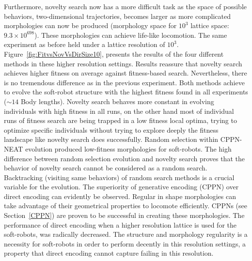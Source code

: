 Furthermore, novelty search now has a more difficult task as the space of possible behaviors, two-dimensional trajectories, becomes larger as more complicated morphologies can now be produced (morphology space for $10^3$ lattice space: $9.3 \times 10^{698}$). These morphologies can achieve life-like locomotion. The same experiment as before held under a lattice resolution of $10^3$. Figure~\ref{fig:FitvsNovVsDirSize10}, presents the results of the four different methods in these higher resolution settings. Results reassure that novelty search achieves higher fitness on average against fitness-based search. Nevertheless, there is no tremendous difference as in the previous experiment. Both methods achieve to evolve the soft-robot structure with the highest fitness found in all experiments ($\sim 14$ Body lengths). Novelty search behaves more constant in evolving individuals with high fitness in all runs, on the other hand most of individual runs of fitness search are being trapped in a low fitness local optima, trying to optimize specific individuals without trying to explore deeply the fitness landscape like novelty search does successfully. Random selection within CPPN-NEAT evolution produced low-fitness morphologies for soft-robots. The high difference between random selection evolution and novelty search proves that the behavior of novelty search cannot be considered as a random search. Backtracking (visiting same behaviors) of random search methods is a crucial variable for the evolution. The superiority of generative encoding (CPPN) over direct encoding can evidently be observed. Regular in shape morphologies can take advantage of their geometrical properties to locomote efficiently. CPPNs (see Section~\ref{CPPN}) are proven to be successful in creating these morphologies. The performance of direct encoding when a higher resolution lattice is used for the soft-robots, was radically decreased. The structure and morphology regularity is a necessity for soft-robots in order to perform decently in this resolution settings, a property that direct encoding cannot capture failing in this resolution.

